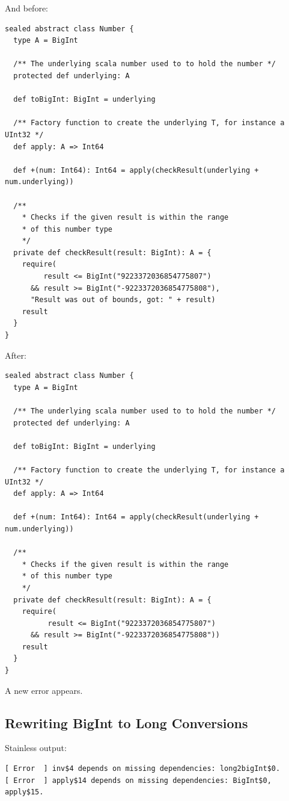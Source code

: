 \documentclass[runningheads]{llncs}
\begin{document}
And before:
\begin{lstlisting}[style=scala]
sealed abstract class Number {
  type A = BigInt

  /** The underlying scala number used to to hold the number */
  protected def underlying: A

  def toBigInt: BigInt = underlying

  /** Factory function to create the underlying T, for instance a UInt32 */
  def apply: A => Int64

  def +(num: Int64): Int64 = apply(checkResult(underlying + num.underlying))

  /**
    * Checks if the given result is within the range
    * of this number type
    */
  private def checkResult(result: BigInt): A = {
    require(
         result <= BigInt("9223372036854775807")
      && result >= BigInt("-9223372036854775808"),
      "Result was out of bounds, got: " + result)
    result
  }
}
\end{lstlisting}

After:
\begin{lstlisting}[style=scala]
sealed abstract class Number {
  type A = BigInt

  /** The underlying scala number used to to hold the number */
  protected def underlying: A

  def toBigInt: BigInt = underlying

  /** Factory function to create the underlying T, for instance a UInt32 */
  def apply: A => Int64

  def +(num: Int64): Int64 = apply(checkResult(underlying + num.underlying))

  /**
    * Checks if the given result is within the range
    * of this number type
    */
  private def checkResult(result: BigInt): A = {
    require(
          result <= BigInt("9223372036854775807")
      && result >= BigInt("-9223372036854775808"))
    result
  }
}
\end{lstlisting}

A new error appears.


\subsection{Rewriting BigInt to Long Conversions}

Stainless output:
\begin{lstlisting}[style=stainless]
[ Error  ] inv$4 depends on missing dependencies: long2bigInt$0.
[ Error  ] apply$14 depends on missing dependencies: BigInt$0, apply$15.
\end{lstlisting}
\end{document}
